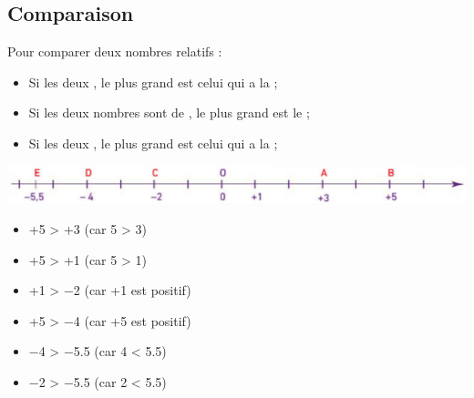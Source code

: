\newpage
\subsection{Comparaison}

\begin{myprops}
	Pour comparer deux nombres relatifs :
	\begin{itemize}
		\item Si les deux , le plus grand est celui qui a la ;
		\item Si les deux nombres sont de , le plus grand est le ;
		\item Si les deux , le plus grand est celui qui a la ;
	\end{itemize}
\end{myprops}


\begin{myexs}
	\begin{center}
		\includegraphics[scale=0.5]{img/droite2}		
	\end{center}


	\begin{multicols}{2}
		\begin{itemize}
			\item +5 > +3 (car 5 > 3)
			\item +5 > +1 (car 5 > 1)
			\item +1 > \num{-2} (car +1 est positif)
			\item +5 > \num{-4} (car +5 est positif)
			\item \num{-4} > \num{-5.5} (car 4 < \num{5.5})
			\item \num{-2} > \num{-5.5} (car 2 < \num{5.5})
		\end{itemize}
	\end{multicols}
\end{myexs}